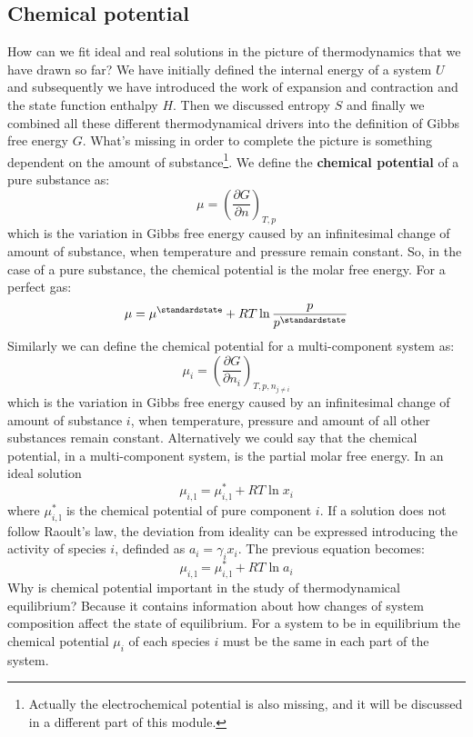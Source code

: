 \documentclass[12pt,a4paper]{report}
\begin{document}
   \subsection*{Chemical potential}
   How can we fit ideal and real solutions in the picture of thermodynamics that we have drawn so far? We have initially defined the internal energy of a system $U$ and subsequently we have introduced the work of expansion and contraction and the state function enthalpy $H$. Then we discussed entropy $S$ and finally we combined all these different thermodynamical drivers into the definition of Gibbs free energy $G$. What's missing in order to complete the picture is something dependent on the amount of substance\footnote{Actually the electrochemical potential is also missing, and it will be discussed in a different part of this module.}. We define the \textbf{chemical potential} of a pure substance as:
   \begin{equation*}
   \mu = \left(\frac{\partial G}{\partial n}\right)_{T,p}
   \end{equation*}
   which is the variation in Gibbs free energy caused by an infinitesimal change of amount of substance, when temperature and pressure remain constant. So, in the case of a pure substance, the chemical potential is the molar free energy.
   For a perfect gas:
   \begin{equation*}
   \mu =\mu^{\standardstate}+RT\ln\frac{p}{p^{\standardstate}} 
   \end{equation*}
   Similarly we can define the chemical potential for a multi-component system as:
   \begin{equation*}
   \mu_{i} = \left(\frac{\partial G}{\partial n_{i}}\right)_{T,p,n_{j\neq i}}
   \end{equation*}
   which is the variation in Gibbs free energy caused by an infinitesimal change of amount of substance $i$, when temperature, pressure and amount of all other substances remain constant. Alternatively we could say that the chemical potential, in a multi-component system, is the partial molar free energy.
   In an ideal solution 
  \begin{equation*}
  \mu_{i,\mathrm{l}} =\mu^{*}_{i,\mathrm{l}}+RT\ln x_{i} 
  \end{equation*}
  where $\mu^{*}_{i,\mathrm{l}}$ is the chemical potential of pure component $i$.
  If a solution does not follow Raoult's law, the deviation from ideality can be expressed introducing the activity of species $i$, definded as $a_{i}=\gamma_{i} x_{i}$. The previous equation becomes:
  \begin{equation*}
  \mu_{i,\mathrm{l}} =\mu^{*}_{i,\mathrm{l}}+RT\ln a_{i} 
  \end{equation*}
  Why is chemical potential important in the study of thermodynamical equilibrium? Because it contains information about how changes of system composition affect the state of equilibrium. For a system to be in equilibrium the chemical potential $\mu_{i}$ of each species $i$ must be the same in each part of the system.
\end{document}
